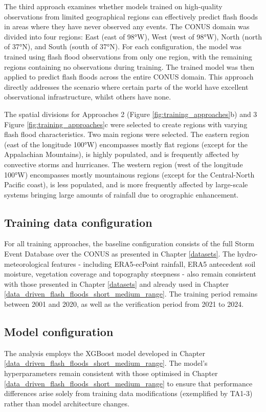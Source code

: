 The  third approach examines whether models trained on high-quality observations from limited geographical regions can effectively predict flash floods in areas where they have never observed any events. The CONUS domain was divided into four regions: East (east of 98°W), West (west of 98°W), North (north of 37°N), and South (south of 37°N). For each configuration, the model was trained using flash flood observations from only one region, with the remaining regions containing no observations during training. The trained model was then applied to predict flash floods across the entire CONUS domain. This approach directly addresses the scenario where certain parts of the world have excellent observational infrastructure, whilst others have none.

The spatial divisions for Approaches 2 (Figure \ref{fig:training_approaches}b) and 3 Figure \ref{fig:training_approaches}c were selected to create regions with varying flash flood characteristics. Two main regions were selected. The eastern region (east of the longitude 100°W) encompasses mostly flat regions (except for the Appalachian Mountains), is highly populated, and is frequently affected by convective storms and hurricanes. The western region (west of the longitude 100°W) encompasses mostly mountainous regions (except for the Central-North Pacific coast), is less populated, and is more frequently affected by large-scale systems bringing large amounts of rainfall due to orographic enhancement.

\subsection{Training data configuration}
For all training approaches, the baseline configuration consists of the full Storm Event Database over the CONUS as presented in Chapter \ref{datasets}. The hydro-meteorological features - including ERA5-ecPoint rainfall, ERA5 antecedent soil moisture, vegetation coverage and topography steepness - also remain consistent with those presented in Chapter \ref{datasets} and already used in Chapter \ref{data_driven_flash_floods_short_medium_range}. The training period remains between 2001 and 2020, as well as the verification period from 2021 to 2024.

\subsection{Model configuration}
The analysis employs the XGBoost model developed in Chapter \ref{data_driven_flash_floods_short_medium_range}. The model's hyperparameters remain consistent with those optimised in Chapter \ref{data_driven_flash_floods_short_medium_range} to ensure that performance differences arise solely from training data modifications (exemplified by TA1-3) rather than model architecture changes. 
 
